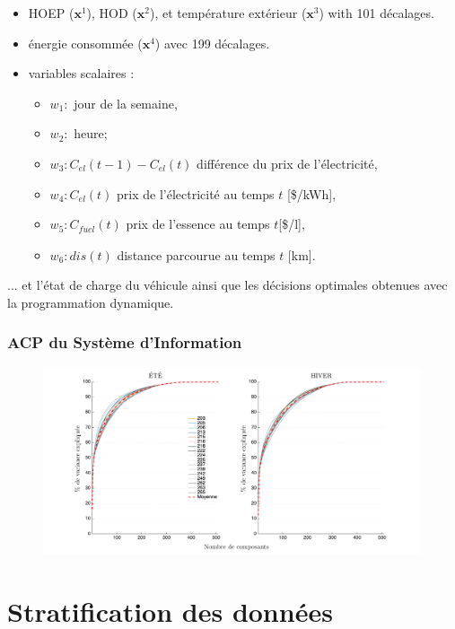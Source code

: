 \documentclass[french]{beamer}
\providecommand{\ve}[1]{{\pmb{#1}}} %
\begin{document}
{\begin{frame}
\begin{itemize}
\item HOEP ($\ve{x}^1$), HOD ($\ve{x}^2$), et température extérieur ($\ve{x}^3$) with 101 décalages.
\item énergie consommée ($\ve{x}^4$) avec 199 décalages.
\item variables scalaires : 
\begin{itemize}
\item $w_1:$ jour de la semaine,
\item $w_2:$ heure;
\item $w_3: C_\mathit{el}(t-1)-C_\mathit{el}(t)$ différence du prix de l'électricité,
\item $w_4: C_\mathit{el}(t)$ prix de l'électricité au temps $t$ [\$/kWh],
\item $w_5: C_\mathit{fuel}(t)$ prix de l’essence au temps $t$[\$/l],
\item $w_6: dis(t)$ distance parcourue au temps $t$ [km].
\end{itemize}
\end{itemize}

\pause
... et l'état de charge du véhicule ainsi que les décisions optimales obtenues avec la programmation dynamique.

\end{frame}

\begin{frame}
\frametitle{ACP du Système d'Information} 
\begin{figure}
\begin{center}
\includegraphics[width=0.99\textwidth]{figPCAvarExplainedFr.png}
\end{center}
\end{figure}
\end{frame}


\section{Stratification des données}
}
\end{document}
